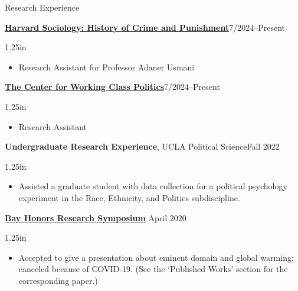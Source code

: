 \documentclass[
	12pt, %
]{resume} %
\newcommand{\righthandindent}{1.25in}
\begin{document}
\begin{rSection}{Research Experience}
%

\href{https://sociology.fas.harvard.edu/}{\textbf{Harvard Sociology: History of Crime and Punishment}}\hfill 7/2024--Present
\begin{adjustwidth}{0pt}{\righthandindent}
\vspace{-7pt}
\begin{itemize}
    \item[] Research Assistant for Professor Adaner Usmani
\end{itemize}
\end{adjustwidth}

\href{https://www.workingclasspolitics.org/}{\textbf{The Center for Working Class Politics}}\hfill 7/2024--Present
\begin{adjustwidth}{0pt}{\righthandindent}
\vspace{-7pt}
\begin{itemize}
    \item[] Research Assistant
\end{itemize}
\end{adjustwidth}

\textbf{Undergraduate Research Experience}, UCLA Political Science\hfill Fall 2022
\begin{adjustwidth}{0pt}{\righthandindent}
\vspace{-7pt}
\begin{itemize}
    \item[] Assisted a graduate student with data collection for a political psychology
experiment in the Race, Ethnicity, and Politics subdiscipline.
\end{itemize}
\end{adjustwidth}

\href{https://bayhonors.org/}{\textbf{Bay Honors Research Symposium}} \hfill  April 2020
\begin{adjustwidth}{0pt}{\righthandindent}
\vspace{-7pt}
\begin{itemize}
    \item[] Accepted to give a presentation about eminent domain and global warming; canceled because of COVID-19. (See the ‘Published Works’ section for the corresponding paper.)
\end{itemize}
\end{adjustwidth}

\end{rSection}
\end{document}
